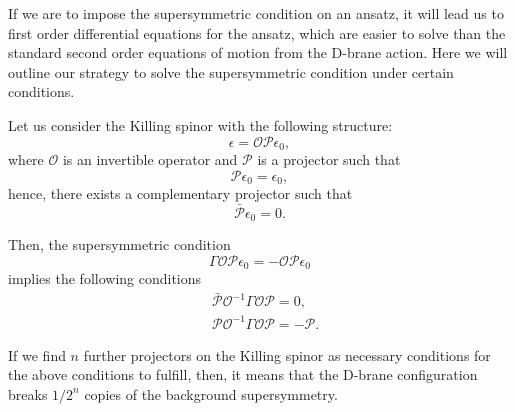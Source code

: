 If we are to impose the supersymmetric condition on an ansatz, it will lead us to first order differential equations for the ansatz, which are easier to solve than the standard second order equations of motion from the D-brane action. Here we will outline our strategy to solve the supersymmetric condition under certain conditions.

Let us consider the Killing spinor with the following structure:
\begin{equation}
\epsilon = \mathcal{O} \mathcal{P} \epsilon_0,
\end{equation}
where $\mathcal{O}$ is an invertible operator and $\mathcal{P}$ is a projector such that
\begin{equation}
    \mathcal{P} \epsilon_0 =  \epsilon_0,
\end{equation}
hence, there exists a complementary projector such that 
\begin{equation}
    \bar{\mathcal{P}} \epsilon_0 =  0.
\end{equation}

Then, the supersymmetric condition
\begin{equation}
 \Gamma \mathcal{O} \mathcal{P} \epsilon_0 = - \mathcal{O} \mathcal{P} \epsilon_0
\end{equation}
implies the following conditions
\begin{align}\label{eq:susyCondition0}
&\bar{\mathcal{P}} \mathcal{O}^{-1} \Gamma \mathcal{O} \mathcal{P}  = 0, \\
&\mathcal{P} \mathcal{O}^{-1} \Gamma \mathcal{O} \mathcal{P} = -\mathcal{P}.
\end{align}


If we find $n$ further projectors on the Killing spinor as necessary conditions for the above conditions to fulfill, then, it means that the D-brane configuration breaks $1/2^n$ copies of the background supersymmetry. 
























